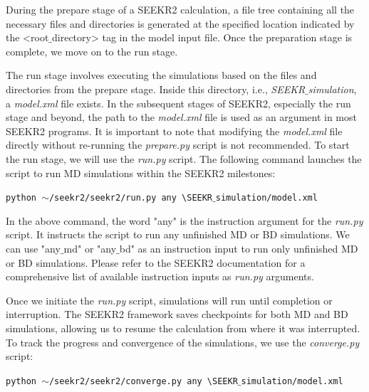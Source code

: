 \documentclass[9pt,training,pubversion]{livecoms}
\begin{document}
\noindent During the prepare stage of a SEEKR2 calculation, a file tree containing all the necessary files and directories is generated at the specified location indicated by the <root$\_$directory> tag in the model input file. Once the preparation stage is complete, we move on to the run stage. 

\noindent The run stage involves executing the simulations based on the files and directories from the prepare stage. Inside this directory, i.e., \textit{SEEKR$\_$simulation}, a \textit{model.xml} file exists. In the subsequent stages of SEEKR2, especially the run stage and beyond, the path to the \textit{model.xml} file is used as an argument in most SEEKR2 programs. It is important to note that modifying the \textit{model.xml} file directly without re-running the \textit{prepare.py} script is not recommended. To start the run stage, we will use the \textit{run.py} script. The following command launches the script to run MD simulations within the SEEKR2 milestones:

\begin{tcolorbox}[colback=black!8!white, colframe=black!50!black, fontlower=\tiny, left=2pt, right=2pt, top=2pt, bottom=2pt] 
\texttt{python $\sim$/seekr2/seekr2/run.py any \textbackslash \linebreak SEEKR$\_$simulation/model.xml}
\end{tcolorbox}

\noindent In the above command, the word "any" is the instruction argument for the \textit{run.py} script. It instructs the script to run any unfinished MD or BD simulations. We can use "any$\_$md" or "any$\_$bd"  as an instruction input to run only unfinished MD or BD simulations. Please refer to the SEEKR2 documentation for a comprehensive list of available instruction inputs as \textit{run.py} arguments.

\noindent Once we initiate the \textit{run.py} script, simulations will run until completion or interruption. The SEEKR2 framework saves checkpoints for both MD and BD simulations, allowing us to resume the calculation from where it was interrupted. To track the progress and convergence of the simulations, we  use the \textit{converge.py} script:

\begin{tcolorbox}[colback=black!8!white, colframe=black!50!black, fontlower=\tiny, left=2pt, right=2pt, top=2pt, bottom=2pt] 
\texttt{python $\sim$/seekr2/seekr2/converge.py any \textbackslash \linebreak SEEKR$\_$simulation/model.xml}
\end{tcolorbox}
\end{document}
